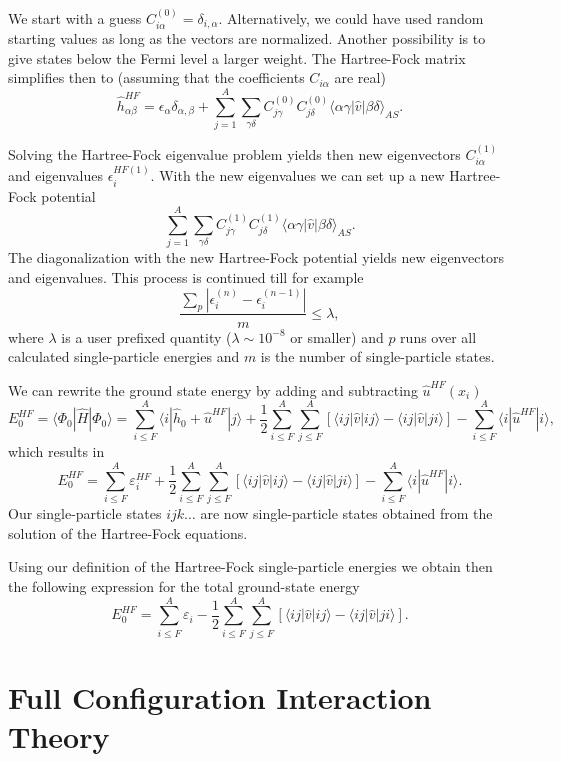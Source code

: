 We start with a guess
$C_{i\alpha}^{(0)}=\delta_{i,\alpha}$. Alternatively, we could have
used random starting values as long as the vectors are
normalized. Another possibility is to give states below the Fermi
level a larger weight.  The Hartree-Fock matrix simplifies then to
(assuming that the coefficients $C_{i\alpha} $ are real)
\[
\hat{h}_{\alpha\beta}^{HF}=\epsilon_{\alpha}\delta_{\alpha,\beta}+
\sum_{j = 1}^A\sum_{\gamma\delta} C_{j\gamma}^{(0)}C_{j\delta}^{(0)}\langle \alpha\gamma|\hat{v}|\beta\delta\rangle_{AS}.
\]




Solving the Hartree-Fock eigenvalue problem yields then new
eigenvectors $C_{i\alpha}^{(1)}$ and eigenvalues $\epsilon_i^{HF(1)}$.
With the new eigenvalues we can set up a new Hartree-Fock potential
\[
\sum_{j = 1}^A\sum_{\gamma\delta} C_{j\gamma}^{(1)}C_{j\delta}^{(1)}\langle \alpha\gamma|\hat{v}|\beta\delta\rangle_{AS}.
\]
The diagonalization with the new Hartree-Fock potential yields new
eigenvectors and eigenvalues.  This process is continued till for
example
\[
\frac{\sum_{p} |\epsilon_i^{(n)}-\epsilon_i^{(n-1)}|}{m} \le \lambda,  
\]
where $\lambda$ is a user prefixed quantity ($\lambda \sim 10^{-8}$ or
smaller) and $p$ runs over all calculated single-particle energies and
$m$ is the number of single-particle states.


We can rewrite the ground state energy by adding and subtracting
$\hat{u}^{HF}(x_i)$
\[
  E_0^{HF} =\langle \Phi_0 | \hat{H} | \Phi_0\rangle = 
\sum_{i\le F}^A \langle i | \hat{h}_0 +\hat{u}^{HF}| j\rangle+ \frac{1}{2}\sum_{i\le F}^A\sum_{j \le F}^A\left[\langle ij |\hat{v}|ij \rangle-\langle ij|\hat{v}|ji\rangle\right]-\sum_{i\le F}^A \langle i |\hat{u}^{HF}| i\rangle,
\]
which results in
\[
  E_0^{HF}
  = \sum_{i\le F}^A \varepsilon_i^{HF} + \frac{1}{2}\sum_{i\le F}^A\sum_{j \le F}^A\left[\langle ij |\hat{v}|ij \rangle-\langle ij|\hat{v}|ji\rangle\right]-\sum_{i\le F}^A \langle i |\hat{u}^{HF}| i\rangle.
\]
Our single-particle states $ijk\dots$ are now single-particle states
obtained from the solution of the Hartree-Fock equations.



Using our definition of the Hartree-Fock single-particle energies we
obtain then the following expression for the total ground-state energy
\[
  E_0^{HF}
  = \sum_{i\le F}^A \varepsilon_i - \frac{1}{2}\sum_{i\le F}^A\sum_{j \le F}^A\left[\langle ij |\hat{v}|ij \rangle-\langle ij|\hat{v}|ji\rangle\right].
\]


\section{Full Configuration Interaction Theory}

